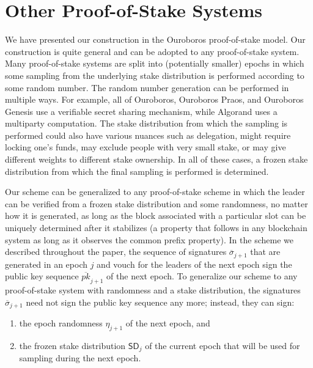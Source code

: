 \section{Other Proof-of-Stake Systems}\label{sec.other}

We have presented our construction in the Ouroboros proof-of-stake model. Our construction
is quite general and can be adopted to any proof-of-stake system. Many proof-of-stake systems are split
into (potentially smaller) epochs in which some sampling from the underlying stake distribution
is performed according to some random number. The random number generation can be performed in multiple
ways. For example, all of Ouroboros, Ouroboros Praos, and Ouroboros Genesis use a verifiable secret
sharing mechanism, while
Algorand uses a multiparty computation. The stake distribution from which the sampling is performed
could also have various nuances such as delegation, might require locking one's funds, may exclude
people with very small stake, or may give different weights to different stake ownership. In all
of these cases, a frozen stake distribution from which the final sampling is performed is determined.

Our scheme can be generalized to any proof-of-stake scheme in which the leader can be verified
from a frozen stake distribution and some randomness, no matter how it is generated, as
long as the block associated with a particular slot can be uniquely determined after it stabilizes
(a property that follows in any blockchain system as long as it observes the common prefix property).
In the scheme we described throughout the paper, the sequence of signatures $\overline{\sigma}_{j+1}$ that are generated
in an epoch $j$ and vouch for the leaders of the next epoch sign the public key sequence $\overline{pk}_{j+1}$
of the next epoch. To generalize our scheme to any proof-of-stake system with randomness and a stake distribution,
the signatures $\overline{\sigma}_{j+1}$ need not sign the public key sequence any more; instead, they
can sign:

\begin{enumerate}
  \item the epoch randomness $\eta_{j+1}$ of the next epoch, and
  \item the frozen stake distribution $\textsf{SD}_j$ of the current epoch
        that will be used for sampling during the next epoch.
\end{enumerate}

